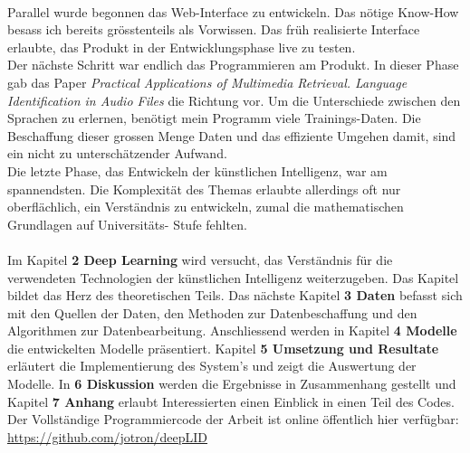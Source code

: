 \\
Parallel wurde begonnen das Web-Interface zu entwickeln. Das nötige Know-How besass ich bereits grösstenteils als Vorwissen. Das früh realisierte Interface erlaubte, das Produkt in der Entwicklungsphase live zu testen. 
\\
Der nächste Schritt war endlich das Programmieren am Produkt. In dieser Phase gab das Paper \textit{Practical Applications of Multimedia Retrieval. Language Identification in Audio
Files}\parencite{iLID} die Richtung vor. 
Um die Unterschiede zwischen den Sprachen zu erlernen, benötigt mein Programm viele Trainings-Daten. Die Beschaffung dieser grossen Menge Daten und das effiziente Umgehen damit, sind ein nicht zu unterschätzender Aufwand. 
\\
Die letzte Phase, das Entwickeln der künstlichen Intelligenz, war am spannendsten. Die Komplexität des Themas erlaubte allerdings oft nur oberflächlich, ein Verständnis zu entwickeln, zumal die mathematischen Grundlagen auf Universitäts- Stufe fehlten. 
\\ \\
Im Kapitel \textbf{2 Deep Learning} wird versucht, das Verständnis für die verwendeten Technologien der künstlichen Intelligenz weiterzugeben. Das Kapitel bildet das Herz des theoretischen Teils. Das nächste Kapitel \textbf{3
Daten} befasst sich mit den Quellen der Daten, den Methoden zur Datenbeschaffung und den Algorithmen zur Datenbearbeitung. Anschliessend werden in Kapitel \textbf{4 Modelle} die entwickelten Modelle präsentiert. Kapitel \textbf{5 Umsetzung und Resultate} erläutert die Implementierung des System's und zeigt die Auswertung der Modelle. In \textbf{6 Diskussion} werden die
Ergebnisse in Zusammenhang gestellt und Kapitel \textbf{7 Anhang} erlaubt Interessierten einen Einblick in einen Teil des Codes. Der Vollständige Programmiercode der Arbeit ist online öffentlich hier verfügbar: \url{https://github.com/jotron/deepLID}
